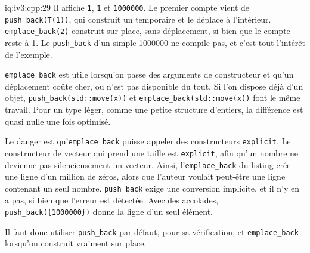 \begin{solution}{iq:iv3:cpp:29}
Il affiche \texttt{1}, \texttt{1} et \texttt{1000000}. Le premier compte vient de \texttt{push\_back(T(1))}, qui construit un temporaire et le déplace à l'intérieur. \texttt{emplace\_back(2)} construit sur place, sans déplacement, si bien que le compte reste à 1. Le \texttt{push\_back} d'un simple 1000000 ne compile pas, et c'est tout l'intérêt de l'exemple.

\texttt{emplace\_back} est utile lorsqu'on passe des arguments de constructeur et qu'un déplacement coûte cher, ou n'est pas disponible du tout. Si l'on dispose déjà d'un objet, \texttt{push\_back(std::move(x))} et \texttt{emplace\_back(std::move(x))} font le même travail. Pour un type léger, comme une petite structure d'entiers, la différence est quasi nulle une fois optimisé.

Le danger est qu'\texttt{emplace\_back} puisse appeler des constructeurs \texttt{explicit}. Le constructeur de vecteur qui prend une taille est \texttt{explicit}, afin qu'un nombre ne devienne pas silencieusement un vecteur. Ainsi, l'\texttt{emplace\_back} du listing crée une ligne d'un million de zéros, alors que l'auteur voulait peut-être une ligne contenant un seul nombre. \texttt{push\_back} exige une conversion implicite, et il n'y en a pas, si bien que l'erreur est détectée. Avec des accolades, \texttt{push\_back(\{1000000\})} donne la ligne d'un seul élément.

Il faut donc utiliser \texttt{push\_back} par défaut, pour sa vérification, et \texttt{emplace\_back} lorsqu'on construit vraiment sur place.

\end{solution}

